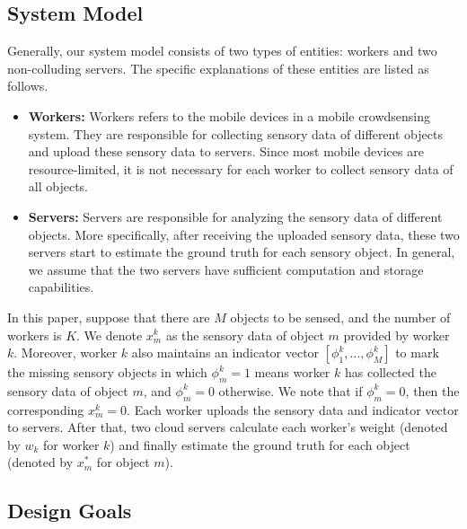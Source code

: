 \documentclass[conference]{IEEEtran}
\begin{document}
\subsection{System Model}\label{sec3-A}
Generally, our system model consists of two types of entities: workers and two non-colluding servers. %
The specific explanations of these entities are listed as follows.
\begin{itemize}
  \item \textbf{Workers:} Workers refers to the mobile devices in a mobile crowdsensing system. They are responsible for collecting sensory data of different objects and upload these sensory data to servers. Since most mobile devices are resource-limited, it is not necessary for each worker to collect sensory data of all objects.
  \item \textbf{Servers:} Servers are responsible for analyzing the sensory data of different objects. More specifically, after receiving the uploaded sensory data, these two servers start to estimate the ground truth for each sensory object. In general, we assume that the two servers have sufficient computation and storage capabilities.
\end{itemize}

In this paper, suppose that there are $M$ objects to be sensed, and the number of workers is $K$.
We denote $x_m^k$ as the sensory data of object $m$ provided by worker $k$.
Moreover, worker $k$ also maintains an indicator vector $[\phi_1^k, \ldots, \phi_M^k]$ to mark the missing sensory objects in which $\phi_m^k = 1$ means worker $k$ has collected the sensory data of object $m$, and $\phi_m^k = 0$ otherwise.
We note that if $\phi_m^k = 0$, then the corresponding $x_m^k = 0$.
Each worker uploads the sensory data and indicator vector to servers.
After that, two cloud servers calculate each worker's weight (denoted by $w_k$ for worker $k$) and finally estimate the ground truth for each object (denoted by $x_m^*$ for object $m$). 
\subsection{Design Goals}
\end{document}
